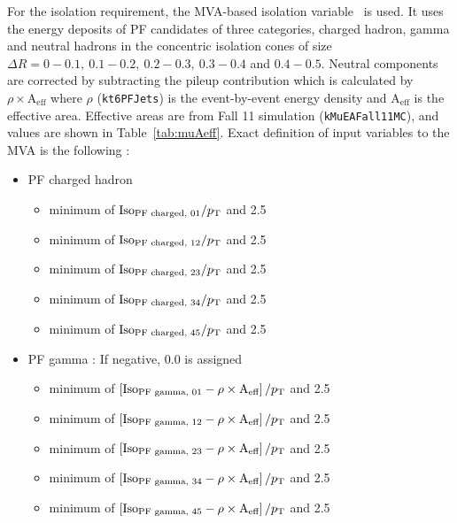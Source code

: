 For the isolation requirement, the MVA-based isolation variable~\cite{MuonRingIso} is used.
It uses the energy deposits of PF candidates of three categories, 
charged hadron, gamma and neutral hadrons in the concentric isolation cones
of size $\Delta R = 0-0.1,~0.1-0.2,~0.2-0.3,~0.3-0.4$ and $0.4-0.5$.
Neutral components are corrected by subtracting the pileup contribution which is 
calculated by $\rho \times \textrm{A}_{\textrm{eff}}$ where $\rho$ (\texttt{kt6PFJets}) is the 
event-by-event energy density and $\textrm{A}_{\textrm{eff}}$ is the effective area.  
Effective areas are from Fall 11 simulation (\texttt{kMuEAFall11MC}), and 
values are shown in Table~\ref{tab:muAeff}.  
Exact definition of input variables to the MVA is the following :
\begin{itemize}
\item PF charged hadron
	\begin{itemize}
    \item minimum of $\textrm{Iso}_\textrm{PF charged, 01}/p_\mathrm{T}$ and 2.5	
    \item minimum of $\textrm{Iso}_\textrm{PF charged, 12}/p_\mathrm{T}$ and 2.5	
    \item minimum of $\textrm{Iso}_\textrm{PF charged, 23}/p_\mathrm{T}$ and 2.5	
    \item minimum of $\textrm{Iso}_\textrm{PF charged, 34}/p_\mathrm{T}$ and 2.5	
    \item minimum of $\textrm{Iso}_\textrm{PF charged, 45}/p_\mathrm{T}$ and 2.5	
	\end{itemize}
\item PF gamma : If negative, 0.0 is assigned
	\begin{itemize}
    \item minimum of $\left[\textrm{Iso}_\textrm{PF gamma, 01} - \rho \times \textrm{A}_{\textrm{eff}}\right]/p_\mathrm{T}$ and 2.5 
    \item minimum of $\left[\textrm{Iso}_\textrm{PF gamma, 12} - \rho \times \textrm{A}_{\textrm{eff}}\right]/p_\mathrm{T}$ and 2.5 
    \item minimum of $\left[\textrm{Iso}_\textrm{PF gamma, 23} - \rho \times \textrm{A}_{\textrm{eff}}\right]/p_\mathrm{T}$ and 2.5 
    \item minimum of $\left[\textrm{Iso}_\textrm{PF gamma, 34} - \rho \times \textrm{A}_{\textrm{eff}}\right]/p_\mathrm{T}$ and 2.5 
    \item minimum of $\left[\textrm{Iso}_\textrm{PF gamma, 45} - \rho \times \textrm{A}_{\textrm{eff}}\right]/p_\mathrm{T}$ and 2.5 

\end{itemize}
\end{itemize}
